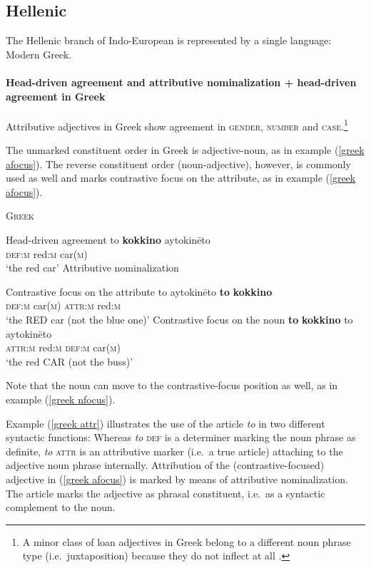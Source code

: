 \subsection{Hellenic}\label{greek synchr}
The Hellenic branch of Indo-European is represented by a single language: Modern Greek. 

\paragraph{Head-driven agreement and attributive nominalization + head-driven agreement in Greek}
Attributive adjectives in Greek show agreement in \textsc{gender, number} and \textsc{case}.\footnote{A minor class of loan adjectives in Greek belong to a different noun phrase type (i.e.~juxtaposition) because they do not inflect at all \cite{ruge1986}.}

The unmarked constituent order in Greek is adjective-noun, as in example (\ref{greek afocus}). The reverse constituent order (noun-adjective), however, is commonly used as well and marks contrastive focus on the attribute, as in example (\ref{greek afocus}).
\begin{exe}
\ex \textsc{Greek} \citep{ruge1986}
\begin{xlist}
\ex	Head-driven agreement \label{greek agr}
\gll	to			\textbf{kokkino} 	aytokinēto\\
	\textsc{def:m}	red:\textsc{m}	car(\textsc{m})\\
\glt	‘the red car’
\ex	Attributive nominalization \label{greek attr}
\begin{xlist}
\ex	Contrastive focus on the attribute \label{greek afocus}
\gll	to 			aytokinēto		\textbf{to}				\textbf{kokkino}\\
	\textsc{def:m}	car(\textsc{m})	\textsc{attr:m}	red:\textsc{m}\\
\glt	‘the RED car (not the blue one)’
\ex	Contrastive focus on the noun \label{greek nfocus}
\gll	\textbf{to}				\textbf{kokkino}		to		aytokinēto\\
	\textsc{attr:m}	red:\textsc{m}	\textsc{def:m}	car(\textsc{m})\\
\glt	‘the red CAR (not the buss)’
\end{xlist}
\end{xlist}
\end{exe}
Note that the noun can move to the contrastive-focus position as well, as in example (\ref{greek nfocus}).

Example (\ref{greek attr}) illustrates the use of the article \textit{to} in two different syntactic functions: Whereas \textit{to} \textsc{def} is a determiner marking the noun phrase as definite, \textit{to} \textsc{attr} is an attributive marker (i.e.~a true article) attaching to the adjective noun phrase internally. Attribution of the (contrastive-focused) adjective in (\ref{greek afocus}) is marked by means of attributive nominalization. The article marks the adjective as phrasal constituent, i.e.~as a syntactic complement to the noun.

